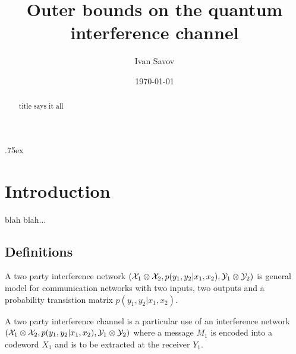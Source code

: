 \documentclass[aps,11pt,twoside,letterpaper]{revtex4}
\begin{document}
\title{{\Large Outer bounds on the quantum interference channel} }
\date{\today} 
\author{Ivan Savov}




\begin{abstract}
    title says it all
\end{abstract}

\parskip .75ex             %
\maketitle


\section{Introduction}


    blah blah...


    \subsection{Definitions}

        \begin{definition}
            A two party interference network $({\cal X}_1 \otimes {\cal X}_2, p(y_1,y_2|x_1,x_2), {\cal Y}_1 \otimes {\cal Y}_2)$ 
            is general model for communication networks with two inputs, two outputs and a probability transistion
            matrix $p(y_1,y_2|x_1,x_2)$.
        \end{definition}
        
        

        \begin{definition}
            A two party interference channel is a particular use of an interference network 
            $({\cal X}_1 \otimes {\cal X}_2, p(y_1,y_2|x_1,x_2), {\cal Y}_1 \otimes {\cal Y}_2)$ 
            where a message $M_1$ is encoded into a codeword $X_1$ and is to be extracted at the receiver $Y_1$.
        \end{definition}
\end{document}
